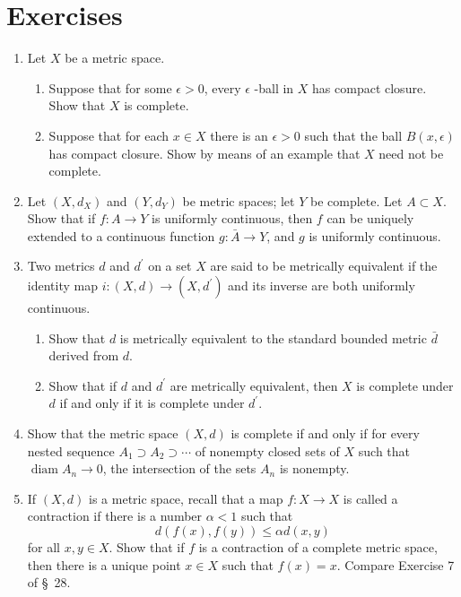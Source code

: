 \section*{Exercises}
\begin{enumerate}[itemsep=0.4em, parsep=0pt, topsep=0pt, partopsep=0pt, leftmargin=*, label=\arabic*., ref=\arabic*]
\item Let \(X\) be a metric space.
 \begin{enumerate}[itemsep=0.2em, parsep=0pt, topsep=0pt, partopsep=0pt, leftmargin=*, label=(\alph*), align=left]
 \item Suppose that for some \(\epsilon > 0\), every \(\epsilon\) -ball in \(X\) has compact closure. Show that \(X\) is complete.
 \item Suppose that for each \(x \in X\) there is an \(\epsilon > 0\) such that the ball \(B({x,\epsilon })\) has compact closure. Show by means of an example that \(X\) need not be complete.
 \end{enumerate}
\item Let \(({X,d_{X}})\) and \(({Y,d_{Y}})\) be metric spaces; let \(Y\) be complete. Let \(A \subset X\). Show that if \(f : A \rightarrow Y\) is uniformly continuous, then \(f\) can be uniquely extended to a continuous function \(g : \bar{A} \rightarrow Y\), and \(g\) is uniformly continuous.
\item Two metrics \(d\) and \(d^{\prime }\) on a set \(X\) are said to be metrically equivalent if the identity map \(i : ({X,d}) \rightarrow ({X,d^{\prime }})\) and its inverse are both uniformly continuous.
 \begin{enumerate}[itemsep=0.2em, parsep=0pt, topsep=0pt, partopsep=0pt, leftmargin=*, label=(\alph*), align=left]
 \item Show that \(d\) is metrically equivalent to the standard bounded metric \(\bar{d}\) derived from \(d\).
 \item Show that if \(d\) and \(d^{\prime }\) are metrically equivalent, then \(X\) is complete under \(d\) if and only if it is complete under \(d^{\prime }\).
 \end{enumerate}
\item Show that the metric space \((X, d)\) is complete if and only if for every nested sequence \(A_{1} \supset {A}_{2} \supset \cdots\) of nonempty closed sets of \(X\) such that \(\operatorname{diam}A_{n} \rightarrow 0\), the intersection of the sets \(A_{n}\) is nonempty.
\item If \((X, d)\) is a metric space, recall that a map \(f : X \rightarrow X\) is called a contraction if there is a number \(\alpha < 1\) such that \[ d({f(x),f( y) }) \leq {\alpha d}({x,y}) \] for all \(x,y \in X\). Show that if \(f\) is a contraction of a complete metric space, then there is a unique point \(x \in X\) such that \(f(x) = x\). Compare Exercise 7 of \S\ 28.

\end{enumerate}
